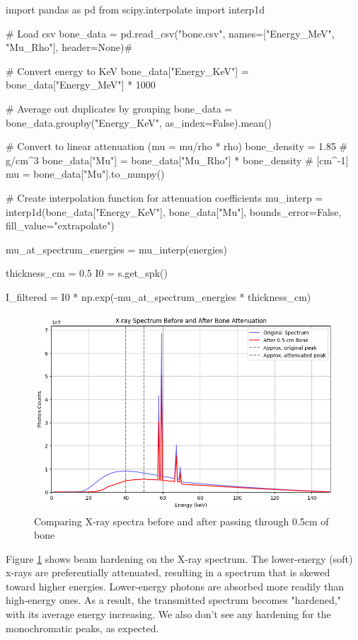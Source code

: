 \documentclass{article}
\theoremstyle{definition}
\begin{document}
\begin{python}
import pandas as pd
from scipy.interpolate import interp1d

# Load csv
bone_data = pd.read_csv("bone.csv", names=["Energy_MeV", "Mu_Rho"], header=None)#

# Convert energy to KeV
bone_data["Energy_KeV"] = bone_data["Energy_MeV"] * 1000

# Average out duplicates by grouping
bone_data = bone_data.groupby("Energy_KeV", as_index=False).mean()

# Convert to linear attenuation (mu = mu/rho * rho)
bone_density = 1.85  # g/cm^3
bone_data["Mu"] = bone_data["Mu_Rho"] * bone_density  # [cm^-1]
mu = bone_data["Mu"].to_numpy()

# Create interpolation function for attenuation coefficients
mu_interp = interp1d(bone_data["Energy_KeV"], bone_data["Mu"], bounds_error=False, fill_value="extrapolate")

mu_at_spectrum_energies = mu_interp(energies)

thickness_cm = 0.5
I0 = s.get_spk()

I_filtered = I0 * np.exp(-mu_at_spectrum_energies * thickness_cm)
\end{python}

\begin{figure}[H]
	\includegraphics[width=\linewidth]{beamhardening.png}
	\caption{Comparing X-ray spectra before and after passing through 0.5cm of bone}
  \label{fig:beamhardening}
\end{figure}

Figure \ref{fig:beamhardening} shows beam hardening on the X-ray spectrum. The lower-energy (soft) x-rays are preferentially attenuated, resulting in a spectrum that is skewed toward higher energies. Lower-energy photons are absorbed more readily than high-energy ones. As a result, the transmitted spectrum becomes "hardened," with its average energy increasing. We also don't see any hardening for the monochromatic peaks, as expected. 
\end{document}
